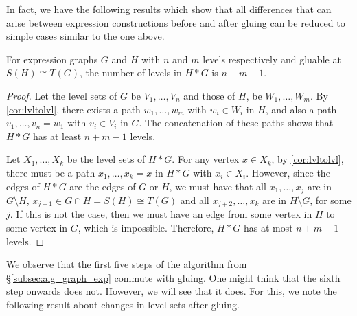 In fact, we have the following results which show that all differences that can
arise between expression constructions before and after gluing can be reduced to
simple cases similar to the one above.

\begin{lem}
For expression graphs $G$ and $H$ with $n$ and $m$ levels respectively and
gluable at $S(H) \cong T(G)$, the number of levels in $H * G$ is $n + m - 1$.
\end{lem}
\begin{proof}
Let the level sets of $G$ be $V_1, \dots, V_n$ and
those of $H$, be $W_1, \dots, W_m$. By \ref{cor:lvltolvl}, there exists a path
$w_1, \dots, w_m$ with $w_i \in W_i$ in $H$, and also a path
$v_1, \dots, v_n = w_1$ with $v_i \in V_i$ in $G$. The concatenation of these
paths shows that $H * G$ has at least $n + m - 1$ levels.

Let $X_1, \dots, X_k$ be the level sets of $H * G$. For any vertex
$x \in X_k$, by \ref{cor:lvltolvl}, there must be a path $x_1, \dots, x_k = x$
in $H * G$ with $x_i \in X_i$. However, since the edges of $H * G$ are the edges
of $G$ or $H$, we must have that all $x_1, \dots, x_{j}$ are in
$G \setminus H$, $x_{j + 1} \in G \cap H = S(H) \cong T(G)$ and all
$x_{j + 2}, \dots, x_k$ are in $H \setminus G$, for some $j$. If this is
not the case, then we must have an edge from some vertex in $H$ to some vertex
in $G$, which is impossible. Therefore, $H * G$ has at most $n + m - 1$ levels.
\end{proof}

We observe that the first five steps of the algorithm from
\S\ref{subsec:alg_graph_exp} commute with gluing. One might think that the sixth
step onwards does not. However, we will see that it does. For this, we note the
following result about changes in level sets after gluing.

